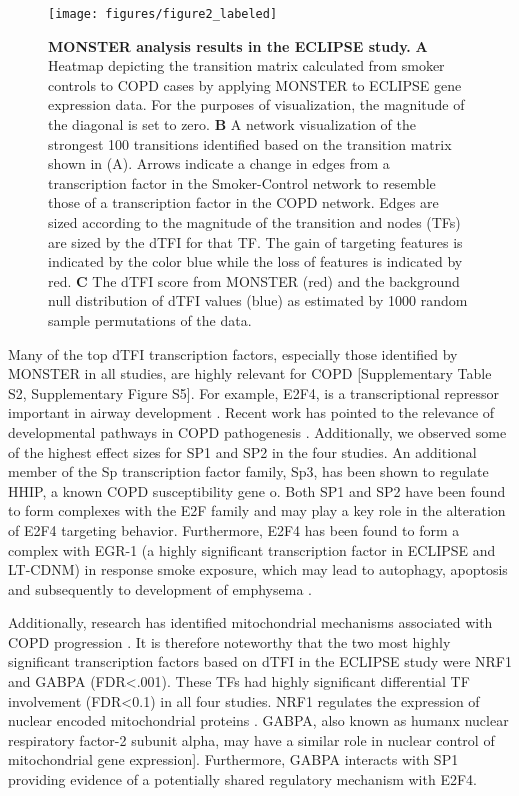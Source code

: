 \documentclass[9pt,twocolumn,twoside]{pnas-new}
\begin{document}
\begin{figure*}%
\centering
\texttt{[image: figures/figure2\_labeled]}
\caption{\textbf{MONSTER analysis results in the ECLIPSE study.} \textbf{A}
Heatmap depicting the transition matrix calculated from smoker controls
to COPD cases by applying MONSTER to ECLIPSE gene expression data.
For the purposes of visualization, the magnitude of the diagonal is
set to zero. \textbf{B} A network visualization of the strongest 100
transitions identified based on the transition matrix shown in (A).
Arrows indicate a change in edges from a transcription factor in the
Smoker-Control network to resemble those of a transcription factor
in the COPD network. Edges are sized according to the magnitude of
the transition and nodes (TFs) are sized by the dTFI for that TF.
The gain of targeting features is indicated by the color blue while
the loss of features is indicated by red. \textbf{C} The dTFI score
from MONSTER (red) and the background null distribution of dTFI values
(blue) as estimated by 1000 random sample permutations of the data.}
\label{fig:ECLIPSE_results}
\end{figure*}



Many of the top dTFI transcription factors, especially those identified
by MONSTER in all studies, are highly relevant for COPD {[}Supplementary
Table S2, Supplementary Figure S5{]}. For example, E2F4, is a transcriptional
repressor important in airway development \cite{danielian2007e2f4}.
Recent work has pointed to the relevance of developmental pathways
in COPD pathogenesis \cite{boucherat2016bridging}. Additionally,
we observed some of the highest effect sizes for SP1 and SP2 in the
four studies. An additional member of the Sp transcription factor
family, Sp3, has been shown to regulate HHIP, a known COPD susceptibility
gene o\cite{zhou2012identification}. Both SP1 and SP2 have been found
to form complexes with the E2F family \cite{rotheneder1999transcription,karlseder1996interaction}
and may play a key role in the alteration of E2F4 targeting behavior.
Furthermore, E2F4 has been found to form a complex with EGR-1 (a highly
significant transcription factor in ECLIPSE and LT-CDNM) in response
smoke exposure, which may lead to autophagy, apoptosis and subsequently
to development of emphysema \cite{chen2008egr}. 

Additionally, research has identified mitochondrial mechanisms associated
with COPD progression \cite{cloonan2016mitochondrial}. It is therefore
noteworthy that the two most highly significant transcription factors
based on dTFI in the ECLIPSE study were NRF1 and GABPA (FDR<.001).
These TFs had highly significant differential TF involvement (FDR<0.1)
in all four studies. NRF1 regulates the expression of nuclear encoded
mitochondrial proteins \cite{gopalakrishnan1995structure}. GABPA,
also known as humanx nuclear respiratory factor-2 subunit alpha, may
have a similar role in nuclear control of mitochondrial gene expression{]}.
Furthermore, GABPA interacts with SP1 \cite{galvagni2001sp1} providing
evidence of a potentially shared regulatory mechanism with E2F4.
\end{document}
